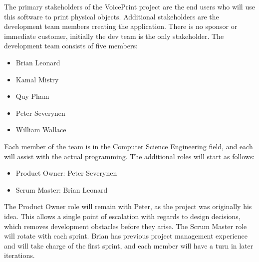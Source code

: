 The primary stakeholders of the VoicePrint project are the end users who will use this software to print physical objects. Additional stakeholders are the development team members creating the application. There is no sponsor or immediate customer, initially the dev team is the only stakeholder.
The development team consists of five members:
\begin{itemize}
    \item Brian Leonard
    \item Kamal Mistry
    \item Quy Pham
    \item Peter Severynen
    \item William Wallace
\end{itemize}
Each member of the team is in the Computer Science Engineering field, and each will assist with the actual programming. The additional roles will start as follows:
\begin{itemize}
  \item Product Owner: Peter Severynen
  \item Scrum Master: Brian Leonard
\end{itemize}
The Product Owner role will remain with Peter, as the project was originally his idea. This allows a single point of escalation with regards to design decisions, which removes development obstacles before they arise.
The Scrum Master role will rotate with each sprint. Brian has previous project management experience and will take charge of the first sprint, and each member will have a turn in later iterations.
